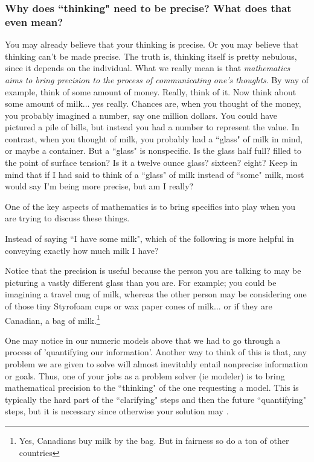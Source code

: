 \documentclass{ximera}
\begin{document}
\subsubsection*{Why does ``thinking" need to be precise? What does that even mean?}
    You may already believe that your thinking is precise. Or you may believe that thinking can't be made precise. The truth is, thinking itself is pretty nebulous, since it depends on the individual. What we really mean is that \textit{mathematics aims to bring precision to the process of communicating one's thoughts}. By way of example, think of some amount of money. Really, think of it. Now think about some amount of milk... yes really. Chances are, when you thought of the money, you probably imagined a number, say one million dollars. You could have pictured a pile of bills, but instead you had a number to represent the value. In contrast, when you thought of milk, you probably had a ``glass" of milk in mind, or maybe a container. But a ``glass" is nonspecific. Is the glass half full? filled to the point of surface tension? Is it a twelve ounce glass? sixteen? eight? Keep in mind that if I had said to think of a ``glass" of milk instead of ``some" milk, most would say I'm being more precise, but am I really?
    
    One of the key aspects of mathematics is to bring specifics into play when you are trying to discuss these things. 
    \begin{example}
        Instead of saying ``I have some milk", which of the following is more helpful in conveying exactly how much milk I have?
        \begin{multipleChoice} 
        \end{multipleChoice}
    \end{example}
    
    Notice that the precision is useful because the person you are talking to may be picturing a vastly different glass than you are. For example; you could be imagining a travel mug of milk, whereas the other person may be considering one of those tiny Styrofoam cups or wax paper cones of milk... or if they are Canadian, a bag of milk.\footnote{Yes, Canadians buy milk by the bag. But in fairness so do a ton of other countries}
    
    \begin{exploration}
        One may notice in our numeric models above that we had to go through a process of 'quantifying our information'. Another way to think of this is that, any problem we are given to solve will almost inevitably entail nonprecise information or goals. Thus, one of your jobs as a problem solver (ie modeler) is to bring mathematical precision to the ``thinking" of the one requesting a model. This is typically the hard part of the ``clarifying" steps and then the future ``quantifying" steps, but it is necessary since otherwise your solution may .
    \end{exploration}
\end{document}

